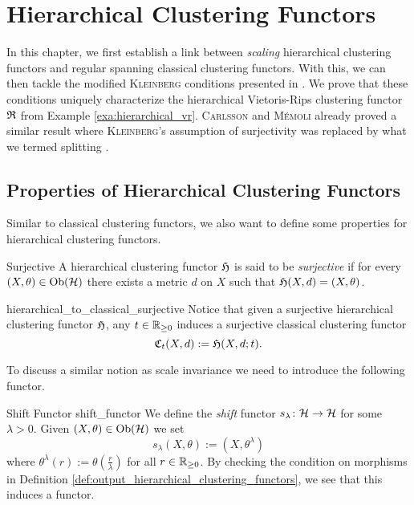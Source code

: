 \chapter{Hierarchical Clustering Functors}
\label{chapter__hierarchical}
In this chapter, we first establish a link between \emph{scaling} hierarchical clustering functors and regular spanning classical clustering functors.
%
With this, we can then tackle the modified \textsc{Kleinberg} conditions presented in \cite[Sec.~7.3.1]{Carlsson2010}.
We prove that these conditions uniquely characterize the hierarchical Vietoris-Rips clustering functor $\mathfrak{R}$ from Example \ref{exa:hierarchical_vr}. \textsc{Carlsson} and \textsc{M\'emoli} already proved a similar result where \textsc{Kleinberg}'s assumption of surjectivity was replaced by what we termed splitting \cite[Thm.~18]{JMLR:v11:carlsson10a}.


\section{Properties of Hierarchical Clustering Functors}

Similar to classical clustering functors, we also want to define some properties for hierarchical clustering functors.

\begin{definition}{Surjective}{}
A hierarchical clustering functor $\mathfrak{H}$ is said to be \emph{surjective} if for every ${(X, \theta) \in \mathrm {Ob}(\mathcal{H})}$ there exists a metric $d$ on $X$ such that $\mathfrak{H}(X,d) = (X, \theta)$.
\end{definition}

\begin{myremark}{}{hierarchical_to_classical_surjective}
Notice that given a surjective hierarchical clustering functor $\mathfrak{H}$, any $t \in \mathbb R_{\geq0}$ induces a surjective classical clustering functor
$$
\mathfrak{C}_t(X,d) := \mathfrak{H}(X, d; t).
$$
\end{myremark}

To discuss a similar notion as scale invariance we need to introduce the following functor.

\begin{definition}{Shift Functor \cite[Ex.~4.3]{Carlsson2010}}{shift_functor}
We define the \emph{shift} functor $s_\lambda\colon \mathcal{H} \to \mathcal{H}$ for some $\lambda > 0$. Given $(X, \theta) \in \mathrm {Ob}(\mathcal{H})$ we set
$$
s_\lambda(X, \theta) := (X, \theta^\lambda)
$$
where $\theta^\lambda(r) := \theta(\frac{r}{\lambda})$ for all $r \in \mathbb R_{\geq0}$.
By checking the condition on morphisms in Definition \ref{def:output_hierarchical_clustering_functors}, we see that this induces a functor.
\end{definition}

